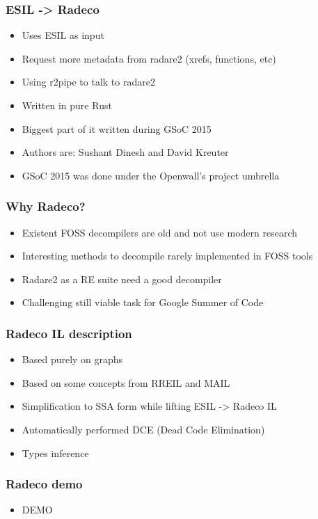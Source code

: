 \documentclass[10pt,pdf,utf8,english,compress,hyperref={unicode}]{beamer}
\begin{document}
\begin{frame}[fragile]
  \frametitle{ESIL -> Radeco }
     \begin{itemize}
        \item Uses ESIL as input
		\item Request more metadata from radare2 (xrefs, functions, etc)
		\item Using r2pipe to talk to radare2
		\item Written in pure Rust
		\item Biggest part of it written during GSoC 2015
		\item Authors are: Sushant Dinesh and David Kreuter 
		\item GSoC 2015 was done under the Openwall's project umbrella
      \end{itemize}
\end{frame}

\begin{frame}[fragile]
  \frametitle{Why Radeco?}
     \begin{itemize}
		\item Existent FOSS decompilers are old and not use modern research
		\item Interesting methods to decompile rarely implemented in FOSS tools
		\item Radare2 as a RE suite need a good decompiler
		\item Challenging still viable task for Google Summer of Code
      \end{itemize}
\end{frame}

\begin{frame}[fragile]
  \frametitle{Radeco IL description}
     \begin{itemize}
        \item Based purely on graphs
		\item Based on some concepts from RREIL and MAIL
		\item Simplification to SSA form while lifting ESIL -> Radeco IL
		\item Automatically performed DCE (Dead Code Elimination)
		\item Types inference 
      \end{itemize}
\end{frame}

\begin{frame}[fragile]
  \frametitle{Radeco demo}
     \begin{itemize}
        \item DEMO
      \end{itemize}
\end{frame}
\end{document}
